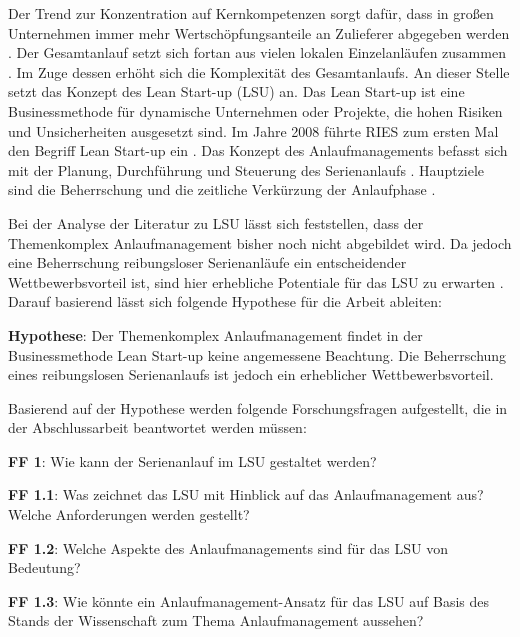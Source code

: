 \documentclass[%
a4paper,
aps,
pra,
 longbibliography,
 lengthcheck,%
]{revtex4-1}
\begin{document}
Der Trend zur Konzentration auf Kernkompetenzen sorgt dafür, dass in großen Unternehmen immer mehr Wertschöpfungsanteile an Zulieferer abgegeben werden  \cite{Hilmola2015, Wildemann2008}. Der Gesamtanlauf setzt sich fortan aus vielen lokalen Einzelanläufen zusammen \cite{Zimolong2006}. Im Zuge dessen erhöht sich die Komplexität des Gesamtanlaufs. An dieser Stelle setzt das Konzept des Lean Start-up (LSU) an. Das Lean Start-up ist eine Businessmethode für dynamische Unternehmen oder Projekte, die hohen Risiken und Unsicherheiten ausgesetzt sind. %
Im Jahre 2008 führte RIES zum ersten Mal den Begriff Lean Start-up ein \cite{Ries2008}. 
Das Konzept des Anlaufmanagements befasst sich mit der Planung, Durchführung und Steuerung des Serienanlaufs \cite[S.8]{Kuhn2002}. Hauptziele sind die Beherrschung und die zeitliche Verkürzung der Anlaufphase \cite{Kuhn2002, Schmitt2015}.

Bei der Analyse der Literatur zu LSU lässt sich feststellen, dass der Themenkomplex Anlaufmanagement bisher noch nicht abgebildet wird. Da jedoch eine Beherrschung reibungsloser Serienanläufe ein entscheidender Wettbewerbsvorteil ist, sind hier erhebliche Potentiale für das LSU zu erwarten \cite[S.XI]{Bischoff2007}. Darauf basierend lässt sich folgende Hypothese für die Arbeit ableiten: 

\textbf{Hypothese}: Der Themenkomplex Anlaufmanagement findet in der Businessmethode Lean Start-up keine angemessene Beachtung. Die Beherrschung eines reibungslosen Serienanlaufs ist jedoch ein erheblicher Wettbewerbsvorteil. 

Basierend auf der Hypothese werden folgende Forschungsfragen aufgestellt, die in der Abschlussarbeit beantwortet werden müssen: 

\textbf{FF 1}: Wie kann der Serienanlauf im LSU gestaltet werden? 

\textbf{FF 1.1}: Was zeichnet das LSU mit Hinblick auf das Anlaufmanagement aus? Welche Anforderungen werden gestellt?

\textbf{FF 1.2}: Welche Aspekte des Anlaufmanagements sind für das LSU von Bedeutung? 

\textbf{FF 1.3}: Wie könnte ein Anlaufmanagement-Ansatz für das LSU auf Basis des Stands der Wissenschaft zum Thema Anlaufmanagement aussehen?  
\end{document}

